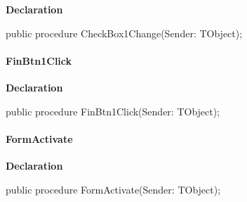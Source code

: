 \documentclass{report}
\newif\ifpdf
\begin{document}
\label{igobase.TIWizFrm-CheckBox1Change}
\begin{list}{}{
\setlength{\itemindent}{0cm}
\setlength{\listparindent}{0cm}
\setlength{\leftmargin}{\evensidemargin}
\addtolength{\leftmargin}{\tmplength}
\settowidth{\labelsep}{X}
\addtolength{\leftmargin}{\labelsep}
\setlength{\labelwidth}{\tmplength}
}
\item[\textbf{Declaration}\hfill]
\ifpdf
\begin{flushleft}
\fi
\begin{ttfamily}
public procedure CheckBox1Change(Sender: TObject);\end{ttfamily}

\ifpdf
\end{flushleft}
\fi

\end{list}
\paragraph*{FinBtn1Click}\hspace*{\fill}

\label{igobase.TIWizFrm-FinBtn1Click}
\begin{list}{}{
\setlength{\itemindent}{0cm}
\setlength{\listparindent}{0cm}
\setlength{\leftmargin}{\evensidemargin}
\addtolength{\leftmargin}{\tmplength}
\settowidth{\labelsep}{X}
\addtolength{\leftmargin}{\labelsep}
\setlength{\labelwidth}{\tmplength}
}
\item[\textbf{Declaration}\hfill]
\ifpdf
\begin{flushleft}
\fi
\begin{ttfamily}
public procedure FinBtn1Click(Sender: TObject);\end{ttfamily}

\ifpdf
\end{flushleft}
\fi

\end{list}
\paragraph*{FormActivate}\hspace*{\fill}

\label{igobase.TIWizFrm-FormActivate}
\begin{list}{}{
\setlength{\itemindent}{0cm}
\setlength{\listparindent}{0cm}
\setlength{\leftmargin}{\evensidemargin}
\addtolength{\leftmargin}{\tmplength}
\settowidth{\labelsep}{X}
\addtolength{\leftmargin}{\labelsep}
\setlength{\labelwidth}{\tmplength}
}
\item[\textbf{Declaration}\hfill]
\ifpdf
\begin{flushleft}
\fi
\begin{ttfamily}
public procedure FormActivate(Sender: TObject);\end{ttfamily}

\ifpdf
\end{flushleft}
\fi

\end{list}
\end{document}
